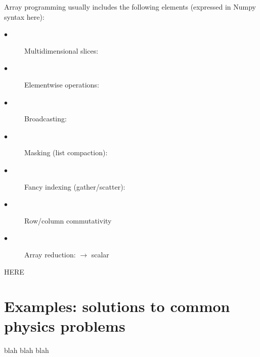 \documentclass{webofc}
\begin{document}
Array programming usually includes the following elements (expressed in Numpy syntax here):

\begin{description}
\item[\hspace{1 cm}$\bullet$] Multidimensional slices:                 
\item[\hspace{1 cm}$\bullet$] Elementwise operations:             
\item[\hspace{1 cm}$\bullet$] Broadcasting:                                        
\item[\hspace{1 cm}$\bullet$] Masking (list compaction):                
\item[\hspace{1 cm}$\bullet$] Fancy indexing (gather/scatter):           
\item[\hspace{1 cm}$\bullet$] Row/column commutativity 
\item[\hspace{1 cm}$\bullet$] Array reduction:  $\to$ scalar
\end{description}

HERE



\section{Examples: solutions to common physics problems}

blah blah blah
\end{document}
